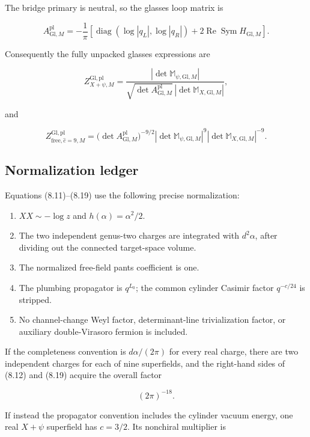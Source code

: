 \documentclass[11pt]{article}
\begin{document}
The bridge primary is neutral, so the glasses loop matrix is

\[
\boxed{
 A_{\mathrm{Gl},M}^{\mathrm{pl}}
 =-\frac1\pi\left[
 \operatorname{diag}(\log|q_L|,\log|q_R|)
 +2\operatorname{Re}\operatorname{Sym}H_{\mathrm{Gl},M}
 \right].}
\tag{8.17}
\]

Consequently the fully unpacked glasses expressions are

\[
\boxed{
 Z_{X+\psi,M}^{\mathrm{Gl},\mathrm{pl}}
 =\frac{|\det\mathbb M_{\psi,\mathrm{Gl},M}|}
 {\sqrt{\det A_{\mathrm{Gl},M}^{\mathrm{pl}}}\,
  |\det\mathbb M_{X,\mathrm{Gl},M}|},}
\tag{8.18}
\]

and

\[
\boxed{
 Z_{\mathrm{free},\widehat c=9,M}^{\mathrm{Gl},\mathrm{pl}}
 =\bigl(\det A_{\mathrm{Gl},M}^{\mathrm{pl}}\bigr)^{-9/2}
  |\det\mathbb M_{\psi,\mathrm{Gl},M}|^9
  |\det\mathbb M_{X,\mathrm{Gl},M}|^{-9}.}
\tag{8.19}
\]

\subsection{Normalization ledger}

Equations (8.11)--(8.19) use the following precise normalization:

\begin{enumerate}
\item \(XX\sim-\log z\) and \(h(\alpha)=\alpha^2/2\).
\item The two independent genus-two charges are integrated with
\(d^2\alpha\), after dividing out the connected target-space volume.
\item The normalized free-field pants coefficient is one.
\item The plumbing propagator is \(q^{L_0}\); the common cylinder Casimir
factor \(q^{-c/24}\) is stripped.
\item No channel-change Weyl factor, determinant-line trivialization factor, or
auxiliary double-Virasoro fermion is included.
\end{enumerate}

If the completeness convention is \(d\alpha/(2\pi)\) for every real charge,
there are two independent charges for each of nine superfields, and the
right-hand sides of (8.12) and (8.19) acquire the overall factor

\[
 (2\pi)^{-18}.
\tag{8.20}
\]

If instead the propagator convention includes the cylinder vacuum energy,
one real \(X+\psi\) superfield has \(c=3/2\).  Its nonchiral multiplier is
\end{document}
